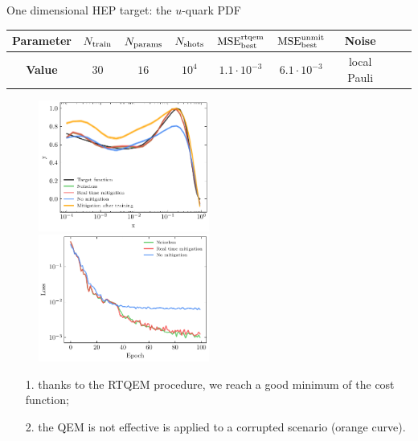 \documentclass[8pt, xcolor={svgnames}, hyperref={linkcolor=black}]{beamer}
\begin{document}
\begin{frame}{One dimensional HEP target: the $u$-quark PDF}

\begin{center}
\footnotesize
\begin{tabular}{ccccccccc}
\hline \hline 
\rule{0pt}{2.5ex}
\textbf{Parameter} & $N_{\rm train}$ & $N_{\rm params}$ & $N_{\rm shots}$ 
& $\text{MSE}_{\rm best}^{\rm rtqem}$ &  $\text{MSE}_{\rm best}^{\rm unmit}$ & Noise \\
\hline
\rule{0pt}{2.5ex}
\textbf{Value} & $30$ & $16$ & $10^{4}$ &  $1.1 \cdot 10^{-3}$ & $6.1 \cdot 10^{-3}$ & local Pauli \\
\hline \hline 
\end{tabular}
\end{center}

\begin{figure}
    \includegraphics[width=0.5\textwidth]{figures/qpdf.pdf}%
    \includegraphics[width=0.5\textwidth]{figures/qpdf_loss.pdf}
\end{figure}
\begin{itemize}[noitemsep]
\item[1.] thanks to the RTQEM procedure, we reach a good minimum of the cost function;
\item[2.] the QEM is not effective is applied to a corrupted scenario (orange curve).
\end{itemize}
\end{frame}
\end{document}

